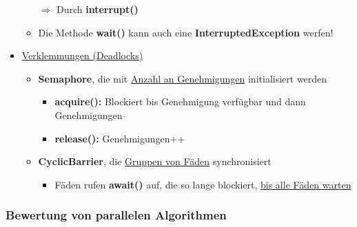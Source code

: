 \documentclass[parskip=full, 12pt]{scrartcl}
\begin{document}
\begin{itemize}
\begin{itemize}
						$\Rightarrow$ Durch \textbf{interrupt()}
						\item Die Methode \textbf{wait()} kann auch eine \textbf{InterruptedException} werfen!
					\end{itemize}
					\item \underline{Verklemmungen (Deadlocks)}
					\begin{itemize}
						\item \textbf{Semaphore}, die mit \underline{Anzahl an Genehmigungen} initialisiert werden
						\begin{itemize}
							\item \textbf{acquire():} Blockiert bis Genehmigung verfügbar und dann Genehmigungen--
							\item \textbf{release():} Genehmigungen++
						\end{itemize}
						\item \textbf{CyclicBarrier}, die \underline{Gruppen von Fäden} synchronisiert
						\begin{itemize}
							\item Fäden rufen \textbf{await()} auf, die so lange blockiert, \underline{bis alle Fäden warten}
						\end{itemize}
					\end{itemize}
				\end{itemize}
			
			\newpage
			\subsubsection{Bewertung von parallelen Algorithmen}
			
\end{document}
